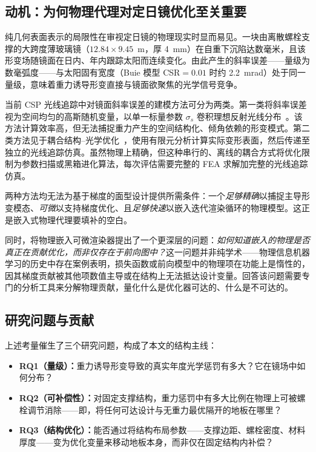 \documentclass[12pt,a4paper]{ctexart}
\begin{document}
\subsection{动机：为何物理代理对定日镜优化至关重要}

纯几何表面表示的局限性在审视定日镜的物理现实时显而易见。一块由离散螺栓支撑的大跨度薄玻璃镜（$12.84 \times 9.45$~m，厚 4~mm）在自重下沉陷达数毫米，且该形变场随镜面在日内、年内跟踪太阳而连续变化。由此产生的斜率误差——量级为数毫弧度——与太阳固有宽度（Buie 模型 CSR$=0.01$ 时约 2.2~mrad）处于同一量级，意味着重力诱导形变直接与镜面欲聚焦的光学信号竞争。

当前 CSP 光线追踪中对镜面斜率误差的建模方法可分为两类。第一类将斜率误差视为空间均匀的高斯随机变量，以单一标量参数 $\sigma_s$ 卷积理想反射光线分布~\cite{hflcal,soltrace}。该方法计算效率高，但无法捕捉重力产生的空间结构化、倾角依赖的形变模式。第二类方法见于耦合结构--光学优化~\cite{yan2024,yan2025,yang2022,thalange2017}，使用有限元分析计算实际变形表面，然后传递至独立的光线追踪仿真。虽然物理上精确，但这种串行的、离线的耦合方式将优化限制为参数扫描或黑箱进化算法，每次评估需要完整的 FEA 求解加完整的光线追踪仿真。

两种方法均无法为基于梯度的面型设计提供所需条件：一个\emph{足够精确}以捕捉主导形变模态、\emph{可微}以支持梯度优化、且\emph{足够快速}以嵌入迭代渲染循环的物理模型。这正是嵌入式物理代理要填补的空白。

同时，将物理嵌入可微渲染器提出了一个更深层的问题：\emph{如何知道嵌入的物理是否真正在贡献优化，而非仅存在于前向图中？}这一问题并非纯学术——物理信息机器学习的历史中存在案例表明，损失函数或前向模型中的物理项在功能上是惰性的，因其梯度贡献被其他项数值主导或在结构上无法抵达设计变量。回答该问题需要专门的分析工具来分解物理贡献，量化什么是优化器可达的、什么是不可达的。

\subsection{研究问题与贡献}

上述考量催生了三个研究问题，构成了本文的结构主线：

\begin{itemize}
  \item \textbf{RQ1（量级）：}重力诱导形变导致的真实年度光学惩罚有多大？它在镜场中如何分布？
  \item \textbf{RQ2（可补偿性）：}对固定支撑结构，重力惩罚中有多大比例在物理上可被螺栓调节消除——即，将任何可达设计与无重力最优隔开的地板在哪里？
  \item \textbf{RQ3（结构优化）：}能否通过将结构布局参数——支撑边距、螺栓密度、材料厚度——变为优化变量来移动地板本身，而非仅在固定结构内补偿？
\end{itemize}
\end{document}
